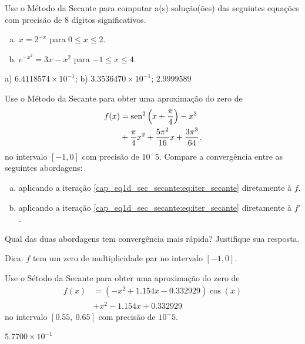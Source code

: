 \begin{exer}
  Use o Método da Secante para computar a(s) solução(ões) das seguintes equações com precisão de 8 dígitos significativos.
  \begin{enumerate}[a)]
  \item $x = 2^{-x}$ para $0\leq x \leq 2$.
  \item $e^{-x^2} = 3x - x^2$ para $-1\leq x\leq 4$.
  \end{enumerate}
\end{exer}
\begin{resp}
  a) $6.4118574\times 10^{-1}$; b) $3.3536470\times 10^{-1}$; $2.9999589$
\end{resp}

\begin{exer}
  Use o Método da Secante para obter uma aproximação do zero de
  \begin{equation}
    \begin{aligned}
      f(x) &= \operatorname{sen}^2\left(x+\frac{\pi}{4}\right) - x^3 \\
           &+ \frac{\pi}{4}x^2 + \frac{5\pi^2}{16}x + \frac{3\pi^3}{64}.
    \end{aligned}
\end{equation}
  no intervalo $[-1, 0]$ com precisão de $10^-5$. Compare a convergência entre as seguintes abordagens:
  \begin{enumerate}[a)]
  \item aplicando a iteração \eqref{cap_eq1d_sec_secante:eq:iter_secante} diretamente à $f$.
  \item aplicando a iteração \eqref{cap_eq1d_sec_secante:eq:iter_secante} diretamente à $f'$.
  \end{enumerate}
  Qual das duas abordagens tem convergência mais rápida? Justifique sua resposta.
\end{exer}
\begin{resp}
  Dica: $f$ tem um zero de multiplicidade par no intervalo $[-1, 0]$.
\end{resp}

\begin{exer}
  Use o Sétodo da Secante para obter uma aproximação do zero de
  \begin{equation}
    \begin{aligned}
      f(x) &= (-x^2+1.154x-0.332929)\cos(x) \\
           &+ x^2 - 1.154x + 0.332929
    \end{aligned}
\end{equation}
no intervalo $[0.55, ~0.65]$ com precisão de $10^-5$.
\end{exer}
\begin{resp}
  $5.7700\times 10^{-1}$
\end{resp}

